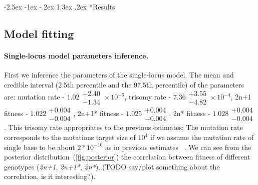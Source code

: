 \documentclass[12pt]{extarticle}
\makeatletter
\renewcommand\section{\@startsection {section}{1}{\z@}%
     {-2.5ex \@plus -1ex \@minus -.2ex}%
     {1.3ex \@plus.2ex}%
    {\Large\bfseries}}
\newcommand{\anwt}{\emph{2n+1}}
\newcommand{\eumt}{\emph{2n*}}
\newcommand{\anmt}{\emph{2n+1*}}
\makeatother
\begin{document}
\section*{Results}

\subsection*{Model fitting}


\paragraph{Single-locus model parameters inference.} 
First we inference the parameters of the single-locus model. The mean and credible interval (2.5th percentile and the 97.5th percentile) of the parameters are:
mutation rate - $1.02\substack{+2.40 \\ -1.34}\times10^{-6}$,
trisomy rate - $7.36\substack{+3.55 \\ -4.82}\times10^{-4}$,
2n+1 fitness - $1.022\substack{+0.004 \\ -0.004}$,
2n+1* fitness - $1.025\substack{+0.004 \\ -0.004}$,
2n* fitness - $1.028\substack{+0.004 \\ -0.004}$.
This trisomy rate appropriates to the previous estimates; The mutation rate corresponds to the mutations target size of $10^{4}$ if we assume the mutation rate of single base to be about $2*10^{-10}$ as in previous estimates ~\citep{Zhu2014}. 
We can see from the posterior distribution~(\autoref{fig:posterior}) the correlation between fitness of different genotypes (\anwt, \anmt, \eumt)..(TODO say/plot something about the correlation, is it interesting?). 
\end{document}
